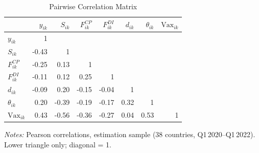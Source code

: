 \begin{table}[H]
\centering
\caption{Pairwise Correlation Matrix}
\label{tab:corr_matrix}
\small
\begin{tabular}{@{} lrrrrrrr @{}}
\toprule
 & $y_{ik}$ & $S_{ik}$ & $F^{CP}_{ik}$ & $F^{DI}_{ik}$ & $d_{ik}$ & $\theta_{ik}$ & $\text{Vax}_{ik}$ \\
\midrule
$y_{ik}$ & 1 &  &  &  &  &  &  \\
$S_{ik}$ & -0.43 & 1 &  &  &  &  &  \\
$F^{CP}_{ik}$ & -0.25 & 0.13 & 1 &  &  &  &  \\
$F^{DI}_{ik}$ & -0.11 & 0.12 & 0.25 & 1 &  &  &  \\
$d_{ik}$ & -0.09 & 0.20 & -0.15 & -0.04 & 1 &  &  \\
$\theta_{ik}$ & 0.20 & -0.39 & -0.19 & -0.17 & 0.32 & 1 &  \\
$\text{Vax}_{ik}$ & 0.43 & -0.56 & -0.36 & -0.27 & 0.04 & 0.53 & 1 \\
\bottomrule
\end{tabular}
\vspace{4pt}

\parbox{\textwidth}{\footnotesize\textit{Notes:} Pearson correlations, estimation sample (38 countries, Q1\,2020--Q1\,2022). Lower triangle only; diagonal = 1.}
\end{table}

